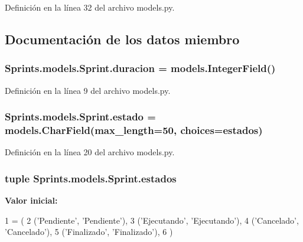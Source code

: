 Definición en la línea 32 del archivo models.\+py.



\subsection{Documentación de los datos miembro}
\subsubsection[{\texorpdfstring{duracion}{duracion}}]{\setlength{\rightskip}{0pt plus 5cm}Sprints.\+models.\+Sprint.\+duracion = models.\+Integer\+Field()\hspace{0.3cm}{\ttfamily [static]}}\hypertarget{class_sprints_1_1models_1_1_sprint_a21683e638d8cfe5a2c7f5963d9b2cf17}{}\label{class_sprints_1_1models_1_1_sprint_a21683e638d8cfe5a2c7f5963d9b2cf17}


Definición en la línea 9 del archivo models.\+py.

\subsubsection[{\texorpdfstring{estado}{estado}}]{\setlength{\rightskip}{0pt plus 5cm}Sprints.\+models.\+Sprint.\+estado = models.\+Char\+Field(max\+\_\+length=50, choices={\bf estados})\hspace{0.3cm}{\ttfamily [static]}}\hypertarget{class_sprints_1_1models_1_1_sprint_a2a9784349eba1639bf4aca9c72c98c5b}{}\label{class_sprints_1_1models_1_1_sprint_a2a9784349eba1639bf4aca9c72c98c5b}


Definición en la línea 20 del archivo models.\+py.

\subsubsection[{\texorpdfstring{estados}{estados}}]{\setlength{\rightskip}{0pt plus 5cm}tuple Sprints.\+models.\+Sprint.\+estados\hspace{0.3cm}{\ttfamily [static]}}\hypertarget{class_sprints_1_1models_1_1_sprint_a261ff3c709405026d85a3dfe47610d93}{}\label{class_sprints_1_1models_1_1_sprint_a261ff3c709405026d85a3dfe47610d93}
{\bfseries Valor inicial\+:}
\begin{DoxyCode}
1 = (
2         (\textcolor{stringliteral}{'Pendiente'}, \textcolor{stringliteral}{'Pendiente'}),
3         (\textcolor{stringliteral}{'Ejecutando'}, \textcolor{stringliteral}{'Ejecutando'}),
4         (\textcolor{stringliteral}{'Cancelado'}, \textcolor{stringliteral}{'Cancelado'}),
5         (\textcolor{stringliteral}{'Finalizado'}, \textcolor{stringliteral}{'Finalizado'}),
6     )
\end{DoxyCode}


